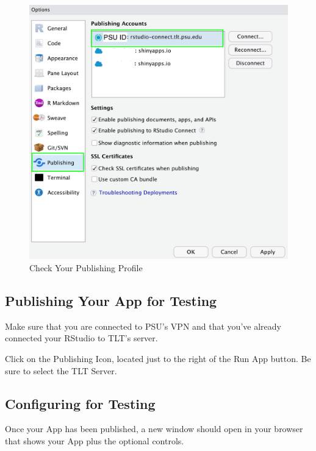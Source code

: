 \documentclass[
]{book}
\begin{document}
\begin{figure}

{\centering \includegraphics[width=17.78in]{images/publish2} 

}

\caption{Check Your Publishing Profile}\label{fig:testing2}
\end{figure}

\hypertarget{publishing-your-app-for-testing}{%
\subsection{Publishing Your App for Testing}\label{publishing-your-app-for-testing}}

Make sure that you are connected to PSU's VPN and that you've already connected your RStudio to TLT's server.

Click on the Publishing Icon, located just to the right of the Run App button. Be sure to select the TLT Server.

\hypertarget{configuring-for-testing}{%
\subsection{Configuring for Testing}\label{configuring-for-testing}}

Once your App has been published, a new window should open in your browser that shows your App plus the optional controls.
\end{document}
